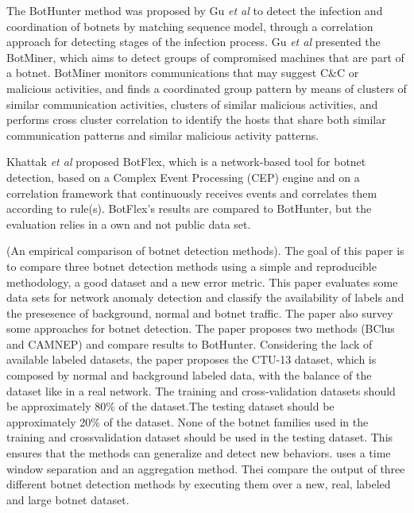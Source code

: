 \documentclass[review]{elsarticle}
\begin{document}
The BotHunter method was proposed by Gu \emph{et al} \cite{gu2007bothunter} to detect the infection and coordination of botnets by matching sequence model, through a correlation approach for detecting stages of the infection process.  Gu \emph{et al} \cite{gu2008botminer} presented the BotMiner, which aims to detect groups of compromised machines that are part of a botnet. BotMiner monitors communications that may suggest C\&C or malicious activities, and finds a coordinated group pattern by means of clusters of similar communication activities, clusters of similar malicious activities, and performs cross cluster correlation to identify the hosts that share both similar communication patterns and similar malicious activity patterns.

Khattak \emph{et al} \cite{khattak2015botflex} proposed BotFlex, which is a network-based tool for botnet detection, based on a Complex Event Processing (CEP) engine and on a correlation framework that continuously receives events and correlates them according to rule(s). BotFlex's results are compared to BotHunter, but the evaluation relies in a own and not public data set.

\cite{garcia2014empirical} (An empirical comparison of botnet detection methods). The goal of this paper is to compare three botnet detection methods using a simple and reproducible methodology, a good dataset and a new error metric. This paper evaluates some data sets for network anomaly detection and classify the availability of labels and the presesence of background, normal and botnet traffic. The paper also survey some approaches for botnet detection. The paper proposes two methods (BClus and CAMNEP) and compare results to BotHunter. Considering the lack of available labeled datasets, the paper proposes the CTU-13 dataset, which is composed by normal and background labeled data, with the balance of the dataset like in a real network. The training and cross-validation datasets should be approximately 80\% of the dataset.The testing dataset should be approximately 20\% of the dataset. None of the botnet families used in the training and crossvalidation dataset should be used in the testing dataset. This ensures that the methods can generalize and detect new behaviors. \cite{garcia2014empirical} uses a time window separation and an aggregation method. Thei compare the output of three different botnet detection methods by executing them over a new, real, labeled and large botnet dataset.
\end{document}
